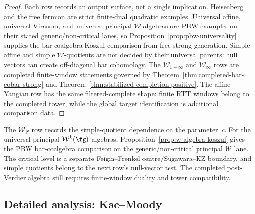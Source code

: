 \begin{proof}
Each row records an output surface, not a single implication.
Heisenberg and the free fermion are strict finite-dual quadratic
examples. Universal affine, universal Virasoro, and universal
principal $\mathcal W$-algebras are PBW examples on their stated
generic/non-critical lanes, so
Proposition~\ref{prop:pbw-universality} supplies the bar-coalgebra
Koszul comparison from free strong generation. Simple affine and
simple $\mathcal W$-quotients are not decided by their universal
parents: null vectors can create off-diagonal bar cohomology. The
$\mathcal W_{1+\infty}$ and $\mathcal W_\infty$ rows are completed
finite-window statements governed by
Theorem~\ref{thm:completed-bar-cobar-strong} and
Theorem~\ref{thm:stabilized-completion-positive}. The affine Yangian
row has the same filtered-complete shape: finite RTT windows belong to
the completed tower, while the global target identification is
additional comparison data.
\end{proof}

\begin{remark}
The $\mathcal{W}_N$ row records the simple-quotient dependence on the
parameter~$c$. For the universal principal
$\mathcal{W}^k(\fg)$-algebras, Proposition~\ref{prop:w-algebra-koszul}
gives the PBW bar-coalgebra comparison on the generic/non-critical
principal $\mathcal W$ lane. The critical level is a separate
Feigin--Frenkel centre/Sugawara--KZ boundary, and simple quotients
belong to the next row's null-vector test. The completed post-Verdier
algebra still requires finite-window duality and tower compatibility.
\end{remark}

\subsection{Detailed analysis: Kac--Moody}

